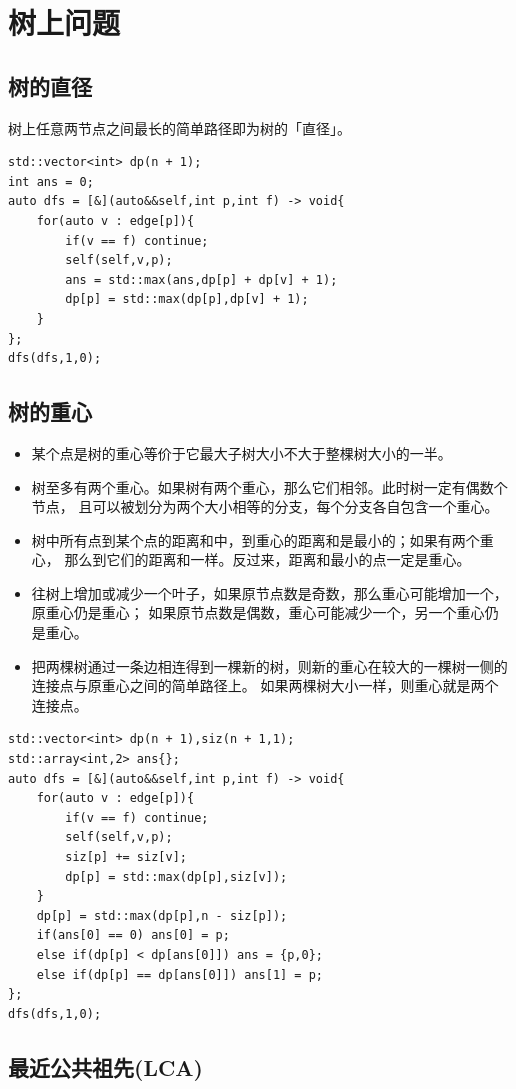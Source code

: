 \section{树上问题}
\subsection{树的直径}
树上任意两节点之间最长的简单路径即为树的「直径」。
\begin{lstlisting}[caption={}]
std::vector<int> dp(n + 1);
int ans = 0;
auto dfs = [&](auto&&self,int p,int f) -> void{
	for(auto v : edge[p]){
		if(v == f) continue;
		self(self,v,p);
		ans = std::max(ans,dp[p] + dp[v] + 1);
		dp[p] = std::max(dp[p],dp[v] + 1);
	}
};
dfs(dfs,1,0);
\end{lstlisting}

\subsection{树的重心}
\begin{itemize}
    \item 某个点是树的重心等价于它最大子树大小不大于整棵树大小的一半。
	\item 树至多有两个重心。如果树有两个重心，那么它们相邻。此时树一定有偶数个节点，
			且可以被划分为两个大小相等的分支，每个分支各自包含一个重心。
	\item 树中所有点到某个点的距离和中，到重心的距离和是最小的；如果有两个重心，
			那么到它们的距离和一样。反过来，距离和最小的点一定是重心。
	\item 往树上增加或减少一个叶子，如果原节点数是奇数，那么重心可能增加一个，原重心仍是重心；
			如果原节点数是偶数，重心可能减少一个，另一个重心仍是重心。
    \item 把两棵树通过一条边相连得到一棵新的树，则新的重心在较大的一棵树一侧的连接点与原重心之间的简单路径上。
		如果两棵树大小一样，则重心就是两个连接点。
\end{itemize}
\begin{lstlisting}[caption={}]
std::vector<int> dp(n + 1),siz(n + 1,1);
std::array<int,2> ans{};
auto dfs = [&](auto&&self,int p,int f) -> void{
	for(auto v : edge[p]){
		if(v == f) continue;
		self(self,v,p);
		siz[p] += siz[v];
		dp[p] = std::max(dp[p],siz[v]);
	}
	dp[p] = std::max(dp[p],n - siz[p]);
	if(ans[0] == 0) ans[0] = p;
	else if(dp[p] < dp[ans[0]]) ans = {p,0};
	else if(dp[p] == dp[ans[0]]) ans[1] = p;
};
dfs(dfs,1,0);
\end{lstlisting}

\subsection{最近公共祖先(LCA)}

